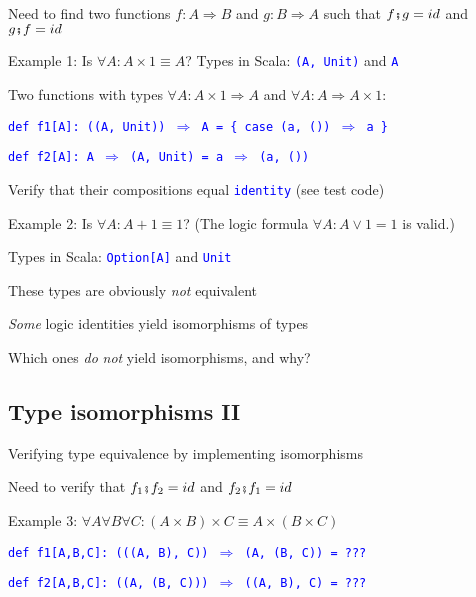Need to find two functions $f:A\Rightarrow B$ and $g:B\Rightarrow A$
such that $f\bef g=id$ and $g\bef f=id$

Example 1: Is $\forall A:A\times1\equiv A$? Types in Scala: \texttt{\textcolor{blue}{\footnotesize{}(A,
Unit)}} and \texttt{\textcolor{blue}{\footnotesize{}A}}{\footnotesize\par}

Two functions with types $\forall A:A\times1\Rightarrow A$ and $\forall A:A\Rightarrow A\times1$:

\texttt{\textcolor{blue}{\footnotesize{}def f1{[}A{]}: ((A, Unit))
$\Rightarrow$ A = \{ case (a, ()) $\Rightarrow$ a \}}}{\footnotesize\par}

\texttt{\textcolor{blue}{\footnotesize{}def f2{[}A{]}: A $\Rightarrow$
(A, Unit) = a $\Rightarrow$ (a, ())}}{\footnotesize\par}

Verify that their compositions equal \texttt{\textcolor{blue}{\footnotesize{}identity}}
(see test code)

Example 2: Is $\forall A:A+1\equiv1$? (The logic formula $\forall A:A\vee1=1$
is valid.)

Types in Scala: \texttt{\textcolor{blue}{\footnotesize{}Option{[}A{]}}}
and \texttt{\textcolor{blue}{\footnotesize{}Unit}}{\footnotesize\par}

These types are obviously \emph{not} equivalent

\emph{Some} logic identities yield\emph{ }isomorphisms of types

Which ones \emph{do} \emph{not} yield isomorphisms, and why?

\subsection{Type isomorphisms II}

Verifying type equivalence by implementing isomorphisms

Need to verify that $f_{1}\bef f_{2}=id$ and $f_{2}\bef f_{1}=id$

Example 3: $\forall A\forall B\forall C:(A\times B)\times C\equiv A\times(B\times C)$

\texttt{\textcolor{blue}{\footnotesize{}def f1{[}A,B,C{]}: (((A, B),
C)) $\Rightarrow$ (A, (B, C)) = ???}}{\footnotesize\par}

\texttt{\textcolor{blue}{\footnotesize{}def f2{[}A,B,C{]}: ((A, (B,
C))) $\Rightarrow$ ((A, B), C) = ???}}{\footnotesize\par}

